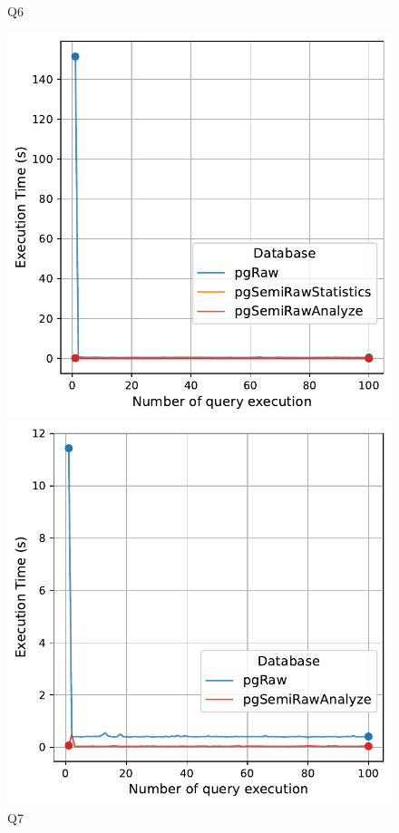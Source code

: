 \begin{figure}[h!]
\begin{minipage}[b]{0.45\linewidth}
    \caption*{Q6}
\end{minipage}
\vspace{0.5cm}
\begin{minipage}[b]{0.45\linewidth}
    \centering
    \includegraphics[width=1.0\linewidth]{charts-eval-exp-time-stat/execution_time_db_type_Q7.pdf}
    \caption*{Q7}
\end{minipage}
\hfill
\begin{minipage}[b]{0.45\linewidth}
    \centering
    \includegraphics[width=1.0\linewidth]{charts-eval-exp-time-stat/execution_time_db_type_Q9.pdf}

\end{minipage}
\end{figure}
